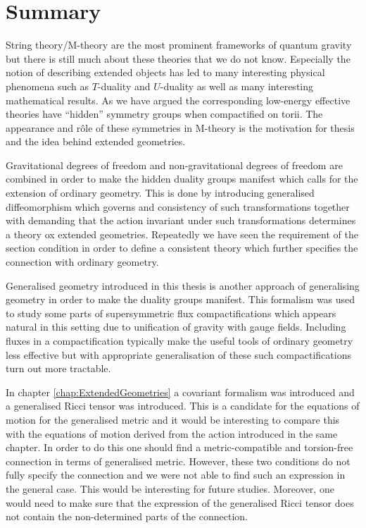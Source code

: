 \chapter{Summary}
String theory/M-theory are the most prominent frameworks of quantum gravity but there is still much about these theories that we do not know. Especially the notion of describing extended objects has led to many interesting physical phenomena such as $T$-duality and $U$-duality as well as many interesting mathematical results. As we have argued the corresponding low-energy effective theories have ``hidden'' symmetry groups when compactified on torii. The appearance and rôle of these symmetries in M-theory is the motivation for thesis and the idea behind extended geometries. 

Gravitational degrees of freedom and non-gravitational degrees of freedom are combined in order to make the hidden duality groups manifest which calls for the extension of ordinary geometry. This is done by introducing generalised diffeomorphism which governs and consistency of such transformations together with demanding that the action invariant under such transformations determines a theory ox extended geometries. Repeatedly we have seen the requirement of the section condition in order to define a consistent theory which further specifies the connection with ordinary geometry. 

Generalised geometry introduced in this thesis is another approach of generalising geometry in order to make the duality groups manifest. This formalism was used to study some parts of supersymmetric flux compactifications which appears natural in this setting due to unification of gravity with gauge fields. Including fluxes in a compactification typically make the useful tools of ordinary geometry less effective but with appropriate generalisation of these such compactifications turn out more tractable. 

In chapter \ref{chap:ExtendedGeometries} a covariant formalism was introduced and a generalised Ricci tensor was introduced. This is a candidate for the equations of motion for the generalised metric and it would be interesting to compare this with the equations of motion derived from the action introduced in the same chapter. In order to do this one should find a metric-compatible and torsion-free connection in terms of generalised metric. However, these two conditions do not fully specify the connection and we were not able to find such an expression in the general case. This would be interesting for future studies. Moreover, one would need to make sure that the expression of the generalised Ricci tensor does not contain the non-determined parts of the connection. 

